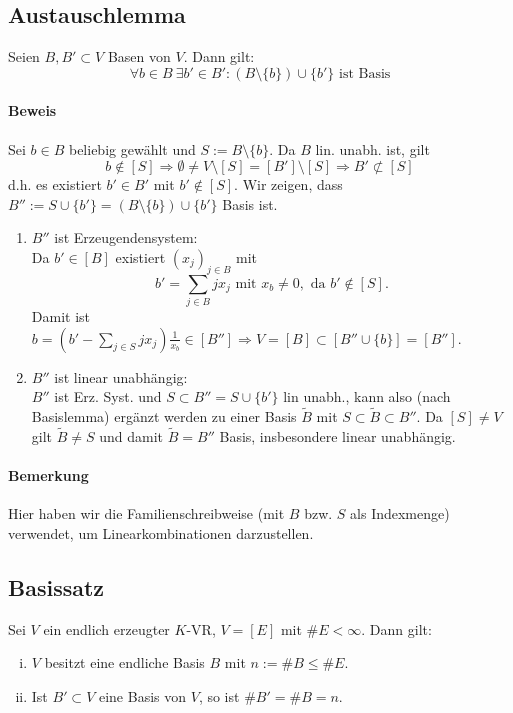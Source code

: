  \subsection{Austauschlemma}
 	\begin{Lemma}[Austauschlemma]
 		Seien $B,B' \subset V$ Basen von $V$. Dann gilt:
 		\[
 			\forall b\in B\ \exists b' \in B': (B\setminus\{b\})\cup\{b'\} \text{ ist Basis}
 		\]
 	\end{Lemma}

 	\paragraph{Beweis}
 		Sei $b\in B$ beliebig gewählt und $S:= B\setminus \{b\}$. Da $B$ lin. unabh. ist, gilt
 		\[
 			b\notin [S] \Rightarrow \emptyset \neq V\setminus [S] = [B']\setminus [S] \Rightarrow B' \not\subset [S]
 		\]
 		d.h. es existiert $b' \in B'$ mit $b' \notin [S]$. Wir zeigen, dass $B'' := S\cup \{b'\} = (B\setminus\{b\})\cup \{b'\}$ Basis ist.

 		\begin{enumerate}
 			\item $B''$ ist Erzeugendensystem:\\
 			      Da $b'\in [B]$ existiert $(x_j)_{j\in B}$ mit
 			      \[
 			      	b' = \sum_{j\in B} jx_j \text{ mit } x_b \neq 0, \text{ da } b' \notin [S].
 			      \]
 			      Damit ist $b=(b'-\sum_{j\in S} jx_j)\frac{1}{x_b} \in [B''] \Rightarrow V = [B] \subset [B'' \cup \{b\}] =  [B'']$.

 			\item $B''$ ist linear unabhängig:\\
 			      $B''$ ist Erz. Syst. und $S\subset B'' = S \cup \{b'\}$ lin unabh., kann also (nach Basislemma) ergänzt werden zu einer Basis $\tilde{B}$ mit $S\subset \tilde{B}\subset B''$.
 			      Da $[S] \neq V$ gilt $\tilde{B} \neq S$ und damit $\tilde{B} = B''$ Basis, insbesondere linear unabhängig.
 		\end{enumerate}

 	\paragraph{Bemerkung}
 		Hier haben wir die Familienschreibweise (mit $B$ bzw. $S$ als Indexmenge) verwendet, um Linearkombinationen darzustellen.

 \subsection{Basissatz}
 	\begin{Satz}[Basissatz]
 		Sei $V$ ein endlich erzeugter $K$-VR, $V=[E]$ mit $\#E < \infty$. Dann gilt:
 		\begin{enumerate}[(i)]
 			\item $V$ besitzt eine endliche Basis $B$ mit $n:= \#B \leq \#E$.
 			\item Ist $B'\subset V$ eine Basis von $V$, so ist $\#B' = \#B = n$.
 		\end{enumerate}
 	\end{Satz}

